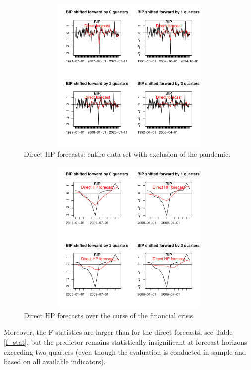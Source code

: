 \documentclass[a4paper]{article}
\begin{document}
\begin{figure}[H]\begin{center}\includegraphics[height=3in, width=4.5in]{./Figures/direct_hp_forecasts.pdf}\caption{Direct HP forecasts: entire data set with exclusion of the pandemic.\label{direct_hp_forecasts}}\end{center}\end{figure}\begin{figure}[H]\begin{center}\includegraphics[height=3in, width=4.5in]{./Figures/direct_hp_forecasts_financial_crisis.pdf}\caption{Direct HP forecasts over the curse of the financial crisis.\label{direct_hp_forecasts_financial_crisis}}\end{center}\end{figure}Moreover, the F-statistics are larger than for the direct forecasts, see Table \eqref{f_stat}, but the predictor remains statistically insignificant at forecast horizons exceeding two quarters (even though the evaluation is conducted in-sample and based on all available indicators). 
\end{document}
